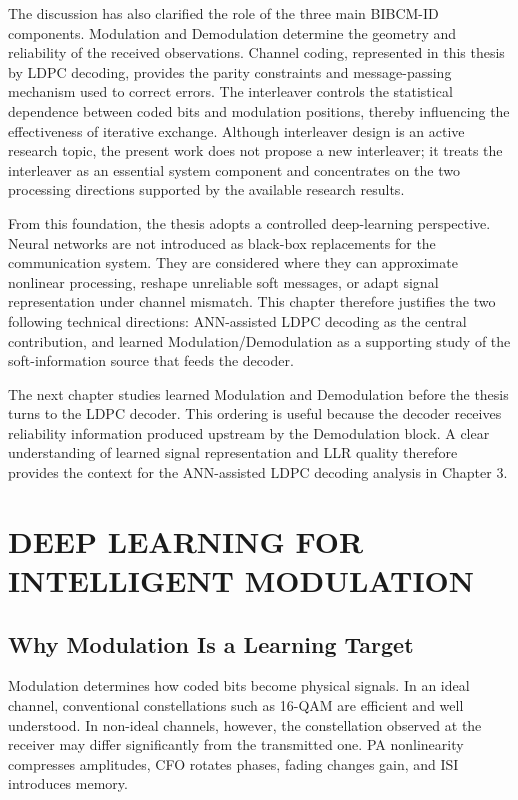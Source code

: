 The discussion has also clarified the role of the three main BIBCM-ID components. Modulation and Demodulation determine the geometry and reliability of the received observations. Channel coding, represented in this thesis by LDPC decoding, provides the parity constraints and message-passing mechanism used to correct errors. The interleaver controls the statistical dependence between coded bits and modulation positions, thereby influencing the effectiveness of iterative exchange. Although interleaver design is an active research topic, the present work does not propose a new interleaver; it treats the interleaver as an essential system component and concentrates on the two processing directions supported by the available research results.

From this foundation, the thesis adopts a controlled deep-learning perspective. Neural networks are not introduced as black-box replacements for the communication system. They are considered where they can approximate nonlinear processing, reshape unreliable soft messages, or adapt signal representation under channel mismatch. This chapter therefore justifies the two following technical directions: ANN-assisted LDPC decoding as the central contribution, and learned Modulation/Demodulation as a supporting study of the soft-information source that feeds the decoder.

The next chapter studies learned Modulation and Demodulation before the thesis turns to the LDPC decoder. This ordering is useful because the decoder receives reliability information produced upstream by the Demodulation block. A clear understanding of learned signal representation and LLR quality therefore provides the context for the ANN-assisted LDPC decoding analysis in Chapter 3.

\chapter[\textbf{DEEP LEARNING FOR MODULATION}]{DEEP LEARNING FOR INTELLIGENT MODULATION}
\section{Why Modulation Is a Learning Target}
Modulation determines how coded bits become physical signals. In an ideal channel, conventional constellations such as 16-QAM are efficient and well understood. In non-ideal channels, however, the constellation observed at the receiver may differ significantly from the transmitted one. PA nonlinearity compresses amplitudes, CFO rotates phases, fading changes gain, and ISI introduces memory.

